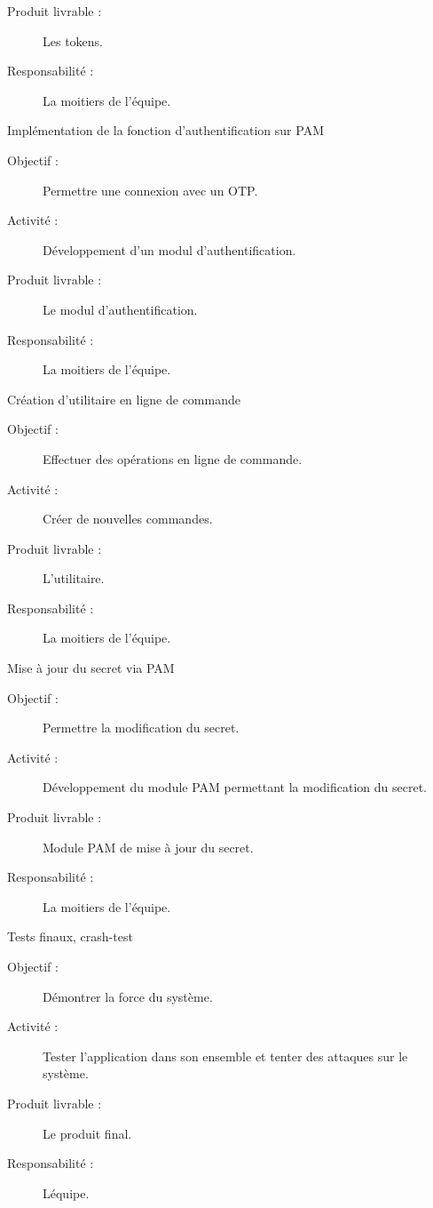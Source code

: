 \documentclass{../../res/univ-projet}
\begin{document}
\begin{description}
\begin{description}
		        \item [Produit livrable :] Les tokens.
		        \item [Responsabilité :]  La moitiers de l'équipe.
		    \end{description}
	    \item [Étape 9 :] Implémentation de la fonction d'authentification sur PAM
		    \begin{description}
		        \item [Objectif :] Permettre une connexion avec un OTP.
		        \item [Activité :] Développement d'un modul d'authentification.
		        \item [Produit livrable :] Le modul d'authentification.
		        \item [Responsabilité :]  La moitiers de l'équipe.
		    \end{description}
	    \item [Étape 10 :] Création d'utilitaire en ligne de commande
		    \begin{description}
		        \item [Objectif :] Effectuer des opérations en ligne de commande.
		        \item [Activité :] Créer de nouvelles commandes.
		        \item [Produit livrable :] L'utilitaire.
		        \item [Responsabilité :]  La moitiers de l'équipe.
		    \end{description}
	    \item [Étape 11 :] Mise à jour du secret via PAM
		    \begin{description}
		        \item [Objectif :] Permettre la modification du secret.
		        \item [Activité :] Développement du module PAM permettant la modification du secret.
		        \item [Produit livrable :] Module PAM de mise à jour du secret.
		        \item [Responsabilité :]  La moitiers de l'équipe.
		    \end{description}
	    \item [Étape 12 :] Tests finaux, crash-test
		    \begin{description}
		        \item [Objectif :] Démontrer la force du système.
		        \item [Activité :] Tester l'application dans son ensemble et tenter des attaques sur le système.
		        \item [Produit livrable :] Le produit final.
		        \item [Responsabilité :]  Léquipe.
		    \end{description}
    \end{description}
    
\end{document}

